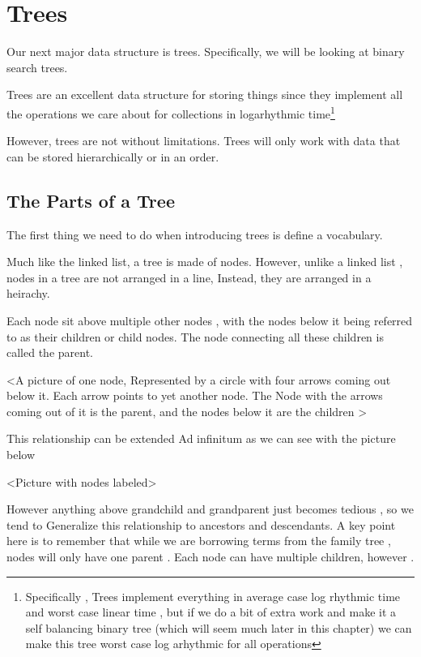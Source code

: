 \documentclass[10pt,a4paper]{book}
\begin{document}
\chapter{Trees}


Our next major data structure is trees.  Specifically, we will be looking at binary search trees.

Trees are an excellent data structure for storing things since they implement all the operations we care about for collections in logarhythmic time\footnote{Specifically , Trees implement everything in average case log rhythmic time and worst case linear time , but if we do a bit of extra work and make it a self balancing binary tree (which will seem much later in this chapter) we can make this tree worst case log arhythmic for all operations}


However, trees are not without limitations.  Trees will only work with data that can be stored hierarchically or in an order.

\section{The Parts of a Tree}

The first thing we need to do when introducing trees is define a vocabulary.  

Much like the linked list, a tree is made of nodes.
However, unlike a linked list , nodes in a tree are not arranged in a line,
Instead, they are arranged in a heirachy.

Each node sit above multiple other nodes , with the nodes below it being referred to as their children or child nodes.  The node connecting all these children is called the parent.

<A picture of one node, Represented by a circle with four arrows coming out below it. Each arrow points to yet another node.  The Node with the arrows coming out of it is the parent, and the nodes below it are the children >


This relationship can be extended Ad infinitum as we can see with the picture below 


<Picture with nodes labeled>


However anything above grandchild and grandparent just becomes tedious , so we tend to  Generalize this relationship to ancestors and descendants.  A key point here is to remember that while we are borrowing terms from the family tree , nodes will only have one parent . Each node can have multiple children, however .
\end{document}
